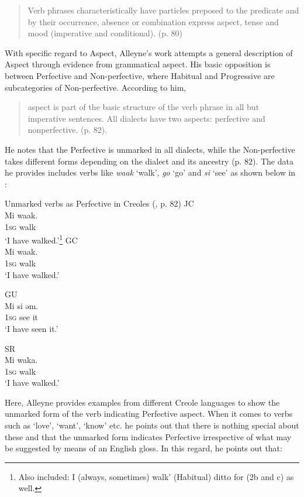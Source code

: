 \begin{quote}
Verb phrases characteristically have particles preposed to the
predicate and by their occurrence, absence or combination express
aspect, tense and mood (imperative and conditional). (p. 80)
\end{quote}

With specific regard to Aspect, Alleyne’s work attempts a general
description of Aspect through evidence from grammatical aspect.  His
basic opposition is between Perfective and Non-perfective, where
Habitual and Progressive are subcategories of Non-perfective.
According to him,

\begin{quote}
aspect is part of the basic structure of the verb phrase in all but
imperative sentences. All dialects have two aspects: perfective and
nonperfective. (p. 82).
\end{quote}

\largerpage
He notes that the Perfective is unmarked in all dialects, while the
Non-per\-fec\-tive takes different forms depending on the dialect and its
ancestry (p. 82).  The data he provides includes verbs like
\textit{waak} `walk', \textit{go} `go' and \textit{si} `see' as shown
below in :

\ea\label{ex:2:2} {Unmarked verbs as Perfective in Creoles
  (\citealt{Alleyne1980}, p.  82)} \ea
JC \\
\gll Mi waak.\\
\textsc{1sg} walk   \\
\glt `I have walked.'\footnote{Also included: I (always, sometimes)
  walk’ (Habitual) ditto for (2b and c) as well.}  \ex
GC \\
\gll Mi waak.\\
\textsc{1sg} walk\\
\glt `I have walked.'

\ex
GU\\
\gll Mi si ǝm.\\
\textsc{1sg} see it \\
\glt `I have seen it.'

\ex SR\\
\gll  Mi waka.\\
\textsc{1sg} walk     \\
\glt `I have walked.' 
\z \z

Here, Alleyne provides examples from different Creole languages to
show the unmarked form of the verb indicating Perfective aspect.  When
it comes to verbs such as `love', `want', `know' etc. he points out
that there is nothing special about these and that the unmarked form
indicates Perfective irrespective of what may be suggested by means of
an English gloss.  In this regard, he points out that:

